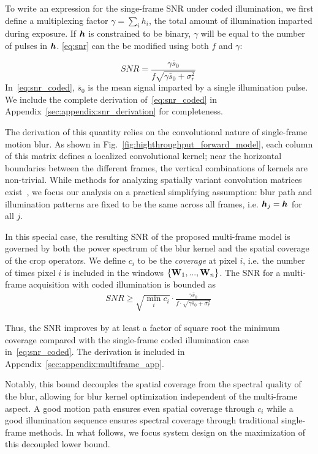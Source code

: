 To write an expression for the singe-frame SNR under coded illumination, we first define a multiplexing factor $\gamma=\sum_{i} h_i$, the total amount of illumination imparted during exposure. If $\bm{h}$ is constrained to be binary, $\gamma$ will be equal to the number of pulses in $\bm{h}$. \eqref{eq:snr} can the be modified using both $f$ and $\gamma$:

\begin{equation}
    \label{eq:snr_coded}
    SNR  = \frac{\gamma\bar{s}_0}{f\sqrt{\gamma\bar{s}_0 + \sigma^2_{r}}}\:
\end{equation}
In~\eqref{eq:snr_coded}, $\bar{s}_0$ is the mean signal imparted by a single illumination pulse. We include the complete derivation of~\eqref{eq:snr_coded} in Appendix~\ref{sec:appendix:snr_derivation} for completeness.

The derivation of this quantity relies on the convolutional nature of single-frame motion blur.
 As shown in Fig.~\ref{fig:highthroughput_forward_model}, each column of this matrix defines a localized convolutional kernel; near the horizontal boundaries between the different frames, the vertical combinations of kernels are non-trivial.
While methods for analyzing spatially variant convolution matrices exist~\cite{chan2011bounds}, we focus our analysis on a practical simplifying assumption: blur path and illumination patterns are fixed to be the same across all frames, i.e. $\bm{h}_j=\bm{h}$ for all $j$.

In this special case, the resulting SNR of the proposed multi-frame model is governed by both the power spectrum of the blur kernel and the spatial coverage of the crop operators. We define $c_i$ to be the \textit{coverage} at pixel $i$, i.e. the number of times pixel $i$ is included in the windows $\{\mathbf{W}_1,...,\mathbf{W}_n\}$.
The SNR for a multi-frame acquisition with coded illumination is bounded as
\begin{align*}
    SNR  \geq \sqrt{
    \min_{i} c_i}  \cdot \frac{ \gamma\bar{s}_0}{f\cdot \sqrt{\gamma\bar{s}_0 + \sigma^2_{r}}}\:
\end{align*}

Thus, the SNR improves by at least a factor of square root the minimum coverage compared with the single-frame coded illumination case in~\eqref{eq:snr_coded}. The derivation is included in Appendix~\ref{sec:appendix:multiframe_app}.

Notably, this bound decouples the spatial coverage from the spectral quality of the blur, allowing for blur kernel optimization independent of the multi-frame aspect. A good motion path ensures even spatial coverage through $c_i$ while a good illumination sequence ensures spectral coverage through traditional single-frame methods. In what follows, we focus system design on the maximization of this decoupled lower bound.

